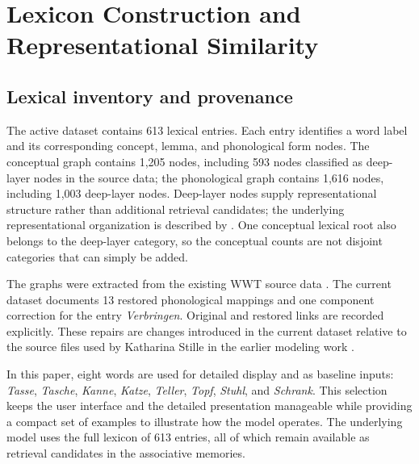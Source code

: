 \section{Lexicon Construction and Representational Similarity}
\subsection{Lexical inventory and provenance}
The active dataset contains 613 lexical entries. Each entry identifies a word label and its corresponding concept, lemma, and phonological form nodes. The conceptual graph contains 1,205 nodes, including 593 nodes classified as deep-layer nodes in the source data; the phonological graph contains 1,616 nodes, including 1,003 deep-layer nodes. Deep-layer nodes supply representational structure rather than additional retrieval candidates; the underlying representational organization is described by \citet{stille2020}. One conceptual lexical root also belongs to the deep-layer category, so the conceptual counts are not disjoint categories that can simply be added.

The graphs were extracted from the existing WWT source data \citep{stille2020}. The current dataset documents 13 restored phonological mappings and one component correction for the entry \emph{Verbringen}. Original and restored links are recorded explicitly. These repairs are changes introduced in the current dataset relative to the source files used by Katharina Stille in the earlier modeling work \citep{stille2020}.

In this paper, eight words are used for detailed display and as baseline inputs: \emph{Tasse}, \emph{Tasche}, \emph{Kanne}, \emph{Katze}, \emph{Teller}, \emph{Topf}, \emph{Stuhl}, and \emph{Schrank}. This selection keeps the user interface and the detailed presentation manageable while providing a compact set of examples to illustrate how the model operates. The underlying model uses the full lexicon of 613 entries, all of which remain available as retrieval candidates in the associative memories.

